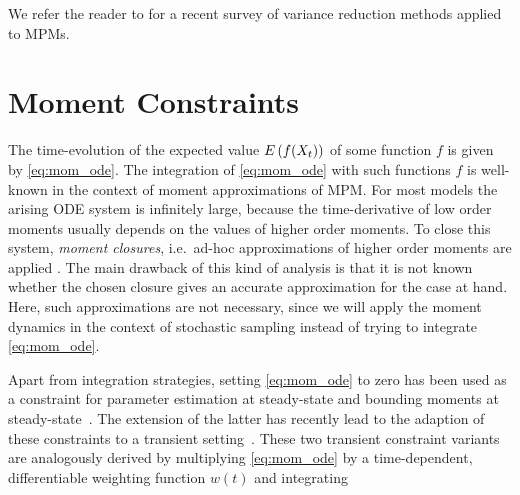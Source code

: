 
We refer the reader to \textcite{beentjes2021a} for a recent survey
of variance reduction methods applied to \acp{MPM}.

\section{Moment Constraints}\label{sec:cv:moments}
The time-evolution of the expected value ${E}\left(f(X_t)\right)$ of some
function $f$ is given by \eqref{eq:mom_ode}.
The integration of \eqref{eq:mom_ode} with such functions $f$ is
well-known in the context of
moment approximations of \ac{MPM}.
For most models the arising \ac{ODE} system is infinitely large,
because the time-derivative of
low order moments usually depends on the values of higher order moments.
To close this system, \emph{moment closures}, i.e.\ ad-hoc
approximations of higher order moments
are applied \parencite{schnoerr2015}.
The main drawback of this kind of analysis is that it is not known
whether the chosen closure gives
an accurate approximation for the case at hand.
Here, such approximations are not necessary, since we will apply the
moment dynamics in the context
of stochastic sampling instead of trying to integrate \eqref{eq:mom_ode}.

Apart from integration strategies,
setting \eqref{eq:mom_ode} to zero has been used as a constraint for
parameter estimation at steady-state
\parencite{backenkohler2018moment} and bounding moments at
steady-state~\parencite{dowdy2018bounds,ghusinga2017exact,kuntz2017rigorous}.
The extension of the latter has recently lead to the adaption of
these constraints
to a transient setting~\parencite{dowdy2018dynamic,sakurai2019bounding}.
These two transient constraint variants are analogously derived by
multiplying \eqref{eq:mom_ode}
by a time-dependent, differentiable weighting function $w(t)$ and integrating

